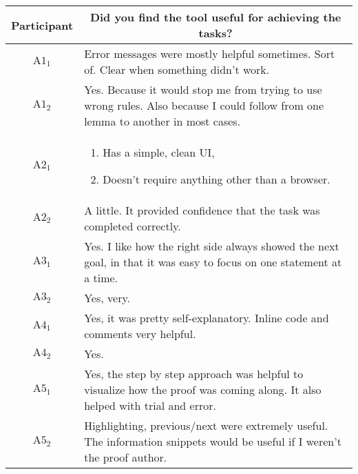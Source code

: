 \clearpage

\noindent
\begin{tabularx}{\linewidth}{@{}cX@{}}
  \toprule
  Participant & \multicolumn{1}{c}{
    \textbf{Did you find the tool useful for achieving the tasks?}
  } \\ \midrule
  $\text{A}1_{1}$ & Error messages were mostly helpful sometimes. Sort of. Clear when something didn't work. \\
  $\text{A}1_{2}$ & Yes.  Because it would stop me from trying to use wrong rules.  Also because I could follow from one lemma to another in most cases. \\
  $\text{A}2_{1}$ & \begin{enumerate} \item Has a simple, clean UI, \item Doesn't require anything other than a browser. \end{enumerate} \\
  $\text{A}2_{2}$ & A little.  It provided confidence that the task was completed correctly. \\
  $\text{A}3_{1}$ & Yes.  I like how the right side always showed the next goal, in that it was easy to focus on one statement at a time. \\
  $\text{A}3_{2}$ & Yes, very. \\
  $\text{A}4_{1}$ & Yes, it was pretty self-explanatory.  Inline code and comments very helpful. \\
  $\text{A}4_{2}$ & Yes. \\
  $\text{A}5_{1}$ & Yes, the step by step approach was helpful to visualize how the proof was coming along.  It also helped with trial and error. \\
  $\text{A}5_{2}$ & Highlighting, previous/next were extremely useful.  The information snippets would be useful if I weren't the proof author. \\
  \bottomrule
\end{tabularx}{\parfillskip=0pt\par}

\clearpage

